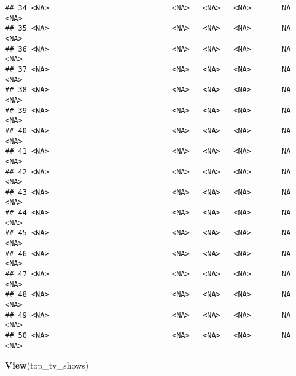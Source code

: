 \documentclass[
]{article}
\newenvironment{Shaded}{\begin{snugshade}}{\end{snugshade}}
\newcommand{\FunctionTok}[1]{\textcolor[rgb]{0.13,0.29,0.53}{\textbf{#1}}}
\newcommand{\NormalTok}[1]{#1}
\begin{document}
\begin{verbatim}
## 34 <NA>                            <NA>   <NA>   <NA>       NA      <NA>
## 35 <NA>                            <NA>   <NA>   <NA>       NA      <NA>
## 36 <NA>                            <NA>   <NA>   <NA>       NA      <NA>
## 37 <NA>                            <NA>   <NA>   <NA>       NA      <NA>
## 38 <NA>                            <NA>   <NA>   <NA>       NA      <NA>
## 39 <NA>                            <NA>   <NA>   <NA>       NA      <NA>
## 40 <NA>                            <NA>   <NA>   <NA>       NA      <NA>
## 41 <NA>                            <NA>   <NA>   <NA>       NA      <NA>
## 42 <NA>                            <NA>   <NA>   <NA>       NA      <NA>
## 43 <NA>                            <NA>   <NA>   <NA>       NA      <NA>
## 44 <NA>                            <NA>   <NA>   <NA>       NA      <NA>
## 45 <NA>                            <NA>   <NA>   <NA>       NA      <NA>
## 46 <NA>                            <NA>   <NA>   <NA>       NA      <NA>
## 47 <NA>                            <NA>   <NA>   <NA>       NA      <NA>
## 48 <NA>                            <NA>   <NA>   <NA>       NA      <NA>
## 49 <NA>                            <NA>   <NA>   <NA>       NA      <NA>
## 50 <NA>                            <NA>   <NA>   <NA>       NA      <NA>
\end{verbatim}

\begin{Shaded}
\begin{Highlighting}[]
\FunctionTok{View}\NormalTok{(top\_tv\_shows)}
\end{Highlighting}
\end{Shaded}
\end{document}
